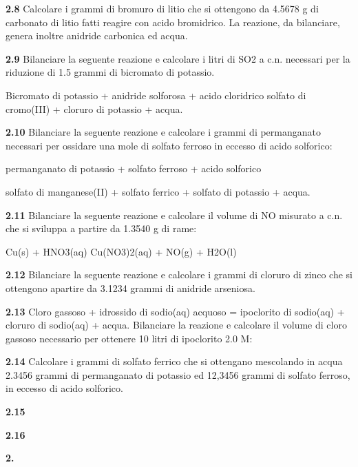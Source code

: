 \vspace{0.2cm}\textbf{2.8} Calcolare i grammi di bromuro di litio che si ottengono da 4.5678 g di carbonato di litio fatti
reagire con acido bromidrico. La reazione, da bilanciare, genera inoltre anidride carbonica ed acqua.

\vspace{0.2cm}\textbf{2.9} Bilanciare la seguente reazione e calcolare i litri di SO2 a c.n. necessari per la riduzione di 1.5
grammi di bicromato di potassio.

Bicromato di potassio + anidride solforosa + acido cloridrico \ce{->} solfato di cromo(III) + cloruro di
potassio + acqua.

\vspace{0.2cm}\textbf{2.10} Bilanciare la seguente reazione e calcolare i grammi di permanganato necessari per ossidare una
mole di solfato ferroso in eccesso di acido solforico:

\begin{center}
permanganato di potassio + solfato ferroso + acido solforico \ce{->}

\ce{->}solfato di manganese(II) + solfato ferrico + solfato di potassio + acqua.
\end{center}

\vspace{0.2cm}\textbf{2.11} Bilanciare la seguente reazione e calcolare il volume di NO misurato a c.n. che si sviluppa a
partire da 1.3540 g di rame:

\begin{center}
Cu(s) + HNO3(aq) \ce{->} Cu(NO3)2(aq) + NO(g) + H2O(l)
\end{center}

\vspace{0.2cm}\textbf{2.12} Bilanciare la seguente reazione e calcolare i grammi di cloruro di zinco che si ottengono apartire da 3.1234 grammi di anidride arseniosa.

\begin{center}
\end{center}

\vspace{0.2cm}\textbf{2.13} Cloro gassoso + idrossido di sodio(aq) acquoso = ipoclorito di sodio(aq) + cloruro di sodio(aq) + acqua.
Bilanciare la reazione e calcolare il volume di cloro gassoso necessario per ottenere 10 litri di ipoclorito 2.0 M:


\vspace{0.2cm}\textbf{2.14} Calcolare i grammi di solfato ferrico che si ottengano mescolando in acqua 2.3456 grammi di permanganato di potassio  ed 12,3456 grammi di solfato ferroso, in eccesso di acido solforico.

\vspace{0.2cm}\textbf{2.15} 

\vspace{0.2cm}\textbf{2.16} 

\vspace{0.2cm}\textbf{2.} 